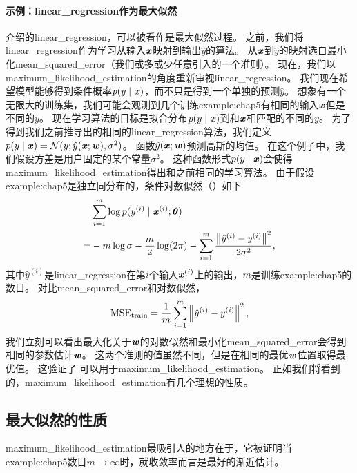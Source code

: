 \paragraph{示例：\gls{linear_regression}作为最大似然} 介绍的\gls{linear_regression}，可以被看作是最大似然过程。
之前，我们将\gls{linear_regression}作为学习从输入$\boldsymbol{\mathit{x}}$映射到输出$\hat{y}$的算法。
从$\boldsymbol{\mathit{x}}$到$\hat{y}$的映射选自最小化\gls{mean_squared_error}（我们或多或少任意引入的一个准则）。
现在，我们以\gls{maximum_likelihood_estimation}的角度重新审视\gls{linear_regression}。
我们现在希望模型能够得到条件概率$p(y \mid \boldsymbol{\mathit{x}})$，而不只是得到一个单独的预测$\hat{y}$。
想象有一个无限大的训练集，我们可能会观测到几个训练\gls{example:chap5}有相同的输入$\boldsymbol{\mathit{x}}$但是不同的$y$。
现在学习算法的目标是拟合分布$p(y \mid \boldsymbol{\mathit{x}})$到和$\boldsymbol{\mathit{x}}$相匹配的不同的$y$。
为了得到我们之前推导出的相同的\gls{linear_regression}算法，我们定义$p(y \mid \boldsymbol{\mathit{x}}) = \mathcal{N}(y; \hat{y}(\boldsymbol{\mathit{x}}; \boldsymbol{\mathit{w}}), \sigma^2)$。
函数$\hat{y}(\boldsymbol{\mathit{x}}; \boldsymbol{\mathit{w}})$预测高斯的均值。
在这个例子中，我们假设方差是用户固定的某个常量$\sigma^2$。
这种函数形式$p(y \mid \boldsymbol{\mathit{x}})$会使得\gls{maximum_likelihood_estimation}得出和之前相同的学习算法。
由于假设\gls{example:chap5}是独立同分布的，条件对数似然（）如下
\begin{align}
     & \sum_{i=1}^m \log p(y^{(i)} \mid \boldsymbol{\mathit{x}}^{(i)}; \boldsymbol{\theta}) \\
    =& -m \log\sigma - \frac{m}{2} \log(2\pi) - \sum_{i=1}^m \frac{ \left\lVert\hat{y}^{(i)} - y^{(i)} \right\rVert^2 }{2\sigma^2},
\end{align}
其中$\hat{y}^{(i)}$是\gls{linear_regression}在第$i$个输入$\boldsymbol{\mathit{x}}^{(i)}$上的输出，$m$是训练\gls{example:chap5}的数目。
对比\gls{mean_squared_error}和对数似然，
\begin{equation}
    \text{MSE}_{\text{train}} = \frac{1}{m} \sum_{i=1}^m \left\lVert\hat{y}^{(i)} - y^{(i)}\right\rVert^2,
\end{equation}
我们立刻可以看出最大化关于$\boldsymbol{\mathit{w}}$的对数似然和最小化\gls{mean_squared_error}会得到相同的参数估计$\boldsymbol{\mathit{w}}$。
这两个准则的值虽然不同，但是在相同的最优$\boldsymbol{\mathit{w}}$位置取得最优值。
这验证了\,\,可以用于\gls{maximum_likelihood_estimation}。
正如我们将看到的，\gls{maximum_likelihood_estimation}有几个理想的性质。


\subsection{最大似然的性质}
\label{sec:properties_of_maximum_likelihood}
\gls{maximum_likelihood_estimation}最吸引人的地方在于，它被证明当\gls{example:chap5}数目$m\to\infty$时，就收敛率而言是最好的渐近估计。

